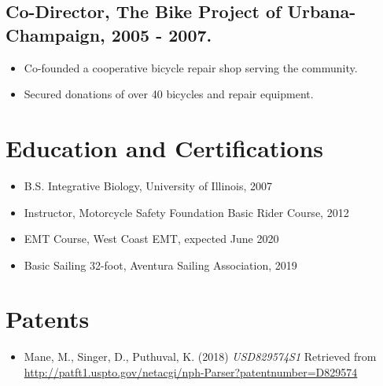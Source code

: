 \documentclass[letterpaper]{article}
\begin{document}
  \subsection*{Co-Director, The Bike Project of Urbana-Champaign, 2005 - 2007.}
  
    \begin{itemize}
      
      \item Co-founded a cooperative bicycle repair shop serving the community.
      \item Secured donations of over 40 bicycles and repair equipment.
      
    \end{itemize}
    
\section*{Education and Certifications}

  \begin{itemize}
    \item B.S. Integrative Biology, University of Illinois, 2007
  \end{itemize}
  \begin{itemize}
    \item Instructor, Motorcycle Safety Foundation Basic Rider Course, 2012
  \end{itemize}
  \begin{itemize}
    \item EMT Course, West Coast EMT, expected June 2020
  \end{itemize}
  \begin{itemize}
    \item Basic Sailing 32-foot, Aventura Sailing Association, 2019
  \end{itemize}

\section*{Patents}

  \begin{itemize}
    \item Mane, M., Singer, D., Puthuval, K. (2018) {\it USD829574S1} Retrieved from \href{http://patft1.uspto.gov/netacgi/nph-Parser?patentnumber=D829574}{http://patft1.uspto.gov/netacgi/nph-Parser?patentnumber=D829574}
  \end{itemize}
\end{document}
